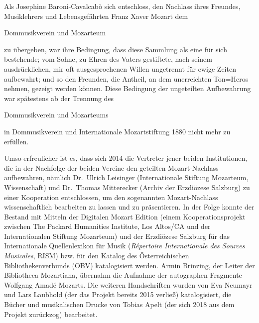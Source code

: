 
Als Josephine Baroni-Cavalcabò sich entschloss, den Nachlass ihres Freundes, Musiklehrers und Lebensgefährten Franz Xaver Mozart dem \begin{itshape}Dommusikverein und Mozarteum\end{itshape} zu übergeben, war ihre Bedingung, \glqq dass diese Sammlung als eine für sich bestehende; vom Sohne, zu Ehren des Vaters gestiftete, nach seinem ausdrücklichen, mir oft ausgesprochenen Willen ungetrennt für ewige Zeiten aufbewahrt; und so den Freunden, die Antheil, an dem unerreichten Ton=Heros nehmen, gezeigt werden können.\grqq{} Diese Bedingung der ungeteilten Aufbewahrung war spätestens ab der Trennung des \begin{itshape}Dommusikverein und Mozarteums\end{itshape} in Dommusikverein und Internationale Mozartstiftung 1880 nicht mehr zu erfüllen.

Umso erfreulicher ist es, dass sich 2014 die Vertreter jener beiden Institutionen, die in der Nachfolge der beiden Vereine den geteilten Mozart-Nachlass aufbewahren, nämlich Dr.~Ulrich Leisinger (Internationale Stiftung Mozarteum, Wissenschaft)  und Dr.~Thomas Mitterecker (Archiv der Erzdiözese Salzburg) zu einer Kooperation entschlossen, um den sogenannten \glqq Mozart-Nachlass\grqq{} wissenschaftlich bearbeiten zu lassen und zu präsentieren. In der Folge konnte der Bestand mit Mitteln der Digitalen Mozart Edition (einem Kooperationsprojekt zwischen The Packard Humanities Institute, Los Altos/CA und der Internationalen Stiftung Mozarteum) und der Erzdiözese Salzburg für das Internationale Quellenlexikon für Musik (\textit{Répertoire Internationale des Sources Musicales}, RISM) bzw. für den Katalog des Österreichischen Bibliothekenverbunds (OBV) katalogisiert werden. Armin Brinzing, der Leiter der Bibliotheca Mozartiana, übernahm die Aufnahme der autographen Fragmente Wolfgang Amadé Mozarts. Die weiteren Handschriften wurden von Eva Neumayr und Lars Laubhold (der das Projekt bereits 2015 verließ) katalogisiert, die Bücher und musikalischen Drucke von Tobias Apelt (der sich 2018 aus dem Projekt zurückzog) bearbeitet.

